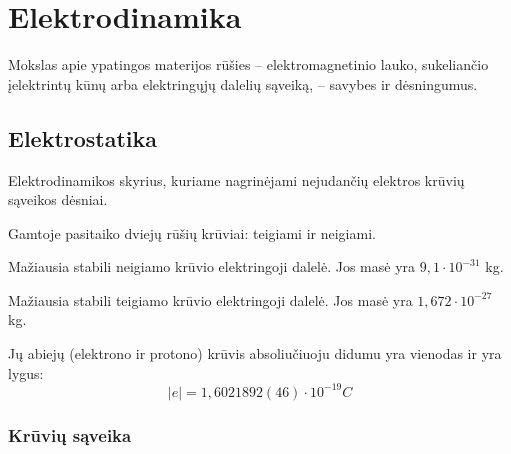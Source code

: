 \chapter{Elektrodinamika}

\begin{defn}[Elektrodinamika]
  Mokslas apie ypatingos materijos rūšies – elektromagnetinio lauko,
  sukeliančio įelektrintų kūnų arba elektringųjų dalelių sąveiką,
  – savybes ir dėsningumus.
\end{defn}

\section{Elektrostatika}

\begin{defn}[Elektrostatika]
  Elektrodinamikos skyrius, kuriame nagrinėjami nejudančių elektros
  krūvių sąveikos dėsniai.
\end{defn}

Gamtoje pasitaiko dviejų rūšių krūviai: teigiami ir neigiami.
\begin{defn}[Elektronas]
  Mažiausia stabili neigiamo krūvio elektringoji dalelė. Jos masė yra
  $9,1 \cdot 10^{-31}$ kg.
\end{defn}
\begin{defn}[Protonas]
  Mažiausia stabili teigiamo krūvio elektringoji dalelė. Jos masė yra
  $1,672 \cdot 10^{-27}$ kg.
\end{defn}
Jų abiejų (elektrono ir protono) krūvis absoliučiuoju didumu yra
vienodas ir yra lygus:
\begin{equation*}
  |e| = 1,6021892(46) \cdot 10^{-19} C
\end{equation*}

\subsection{Krūvių sąveika}

